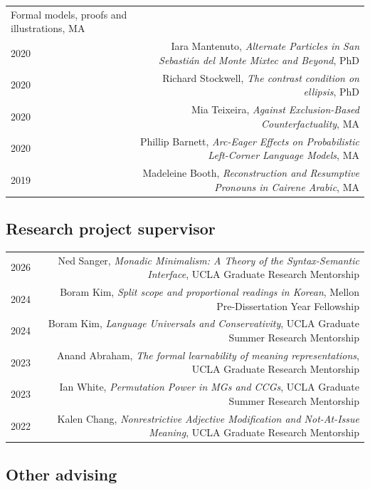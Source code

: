 \documentclass[12pt]{article}
\begin{document}
\begin{longtable}{LR}
{            Formal models, proofs and illustrations}, MA\\
  2020    & Iara Mantenuto, \textit{Alternate Particles in San Sebasti\'{a}n del
            Monte Mixtec and Beyond}, PhD\\
  2020    & Richard Stockwell, \textit{The contrast condition on ellipsis},
            PhD\\
  2020    & Mia Teixeira, \textit{Against Exclusion-Based Counterfactuality},
            MA\\
  2020    & Phillip Barnett, \textit{Arc-Eager Effects on Probabilistic
            Left-Corner Language Models}, MA\\
  2019    & Madeleine Booth, \textit{Reconstruction and Resumptive Pronouns in
            Cairene Arabic}, MA
\end{longtable}

\subsection*{Research project supervisor}

\begin{longtable}{LR}
  2026     & Ned Sanger, \textit{Monadic Minimalism: A Theory of the
             Syntax-Semantic Interface}, UCLA Graduate Research Mentorship
  \\
  2024     & Boram Kim, \textit{Split scope and proportional readings in
             Korean}, Mellon Pre-Dissertation Year Fellowship
  \\
  2024     & Boram Kim, \textit{Language Universals and Conservativity}, UCLA Graduate Summer Research Mentorship
  \\
  2023     & Anand Abraham, \textit{The formal learnability of meaning
             representations}, UCLA Graduate Research Mentorship
  \\
  2023     & Ian White, \textit{Permutation Power in MGs and CCGs}, UCLA
             Graduate Summer Research Mentorship
  \\
  2022     & Kalen Chang, \textit{Nonrestrictive Adjective Modification and
             Not-At-Issue Meaning}, UCLA Graduate Research Mentorship
\end{longtable}

\subsection*{Other advising}
\end{document}

